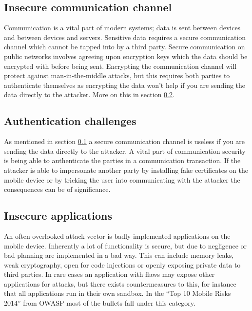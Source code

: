 \subsection{Insecure communication channel}
\label{sec:unsecureCommunication}
Communication is a vital part of modern systems; data is sent between devices and between devices and servers. Sensitive data requires a secure communication channel which cannot be tapped into by a third party. Secure communication on public networks involves agreeing upon encryption keys which the data should be encrypted with before being sent. Encrypting the communication channel will protect against man-in-the-middle attacks, but this requires both parties to authenticate themselves as encrypting the data won't help if you are sending the data directly to the attacker. More on this in section \ref{sec:authenticationChallenges}.

\subsection{Authentication challenges}
\label{sec:authenticationChallenges}
As mentioned in section \ref{sec:unsecureCommunication} a secure communication channel is useless if you are sending the data directly to the attacker. A vital part of communication security is being able to authenticate the parties in a communication transaction. If the attacker is able to impersonate another party by installing fake certificates on the mobile device or by tricking the user into communicating with the attacker the consequences can be of significance.

\subsection{Insecure applications}
An often overlooked attack vector is badly implemented applications on the mobile device. Inherently a lot of functionality is secure, but due to negligence or bad planning are implemented in a bad way. This can include memory leaks, weak cryptography, open for code injections or openly exposing private data to third parties. In rare cases an application with flaws may expose other applications for attacks, but there exists countermeasures to this, for instance that all applications run in their own sandbox. In the ``Top 10 Mobile Risks 2014'' from OWASP \cite{OWASPTopTenMobile} most of the bullets fall under this category.
\fi %
